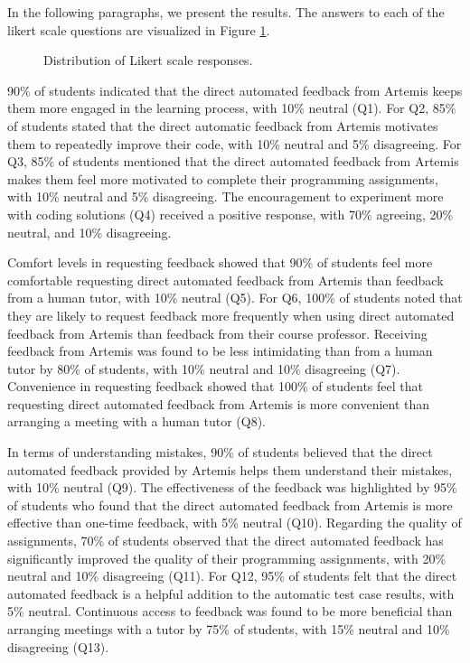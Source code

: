 \documentclass[manuscript,screen,review]{acmart}
\begin{document}
In the following paragraphs, we present the results. 
The answers to each of the likert scale questions are visualized in Figure \ref{fig:Survey-Results}.

\begin{figure}[htpb]
  \centering
  \resizebox{0.8\textwidth}{!}{
    
  }
  \caption[Distribution of Likert scale responses]{Distribution of Likert scale responses.}
  \label{fig:Survey-Results}
\end{figure}

90\% of students indicated that the direct automated feedback from Artemis keeps them more engaged in the learning process, with 10\% neutral (Q1).
For Q2, 85\% of students stated that the direct automatic feedback from Artemis motivates them to repeatedly improve their code, with 10\% neutral and 5\% disagreeing.
For Q3, 85\% of students mentioned that the direct automated feedback from Artemis makes them feel more motivated to complete their programming assignments, with 10\% neutral and 5\% disagreeing.
The encouragement to experiment more with coding solutions (Q4) received a positive response, with 70\% agreeing, 20\% neutral, and 10\% disagreeing.


Comfort levels in requesting feedback showed that 90\% of students feel more comfortable requesting direct automated feedback from Artemis than feedback from a human tutor, with 10\% neutral (Q5).
For Q6, 100\% of students noted that they are likely to request feedback more frequently when using direct automated feedback from Artemis than feedback from their course professor.
Receiving feedback from Artemis was found to be less intimidating than from a human tutor by 80\% of students, with 10\% neutral and 10\% disagreeing (Q7).
Convenience in requesting feedback showed that 100\% of students feel that requesting direct automated feedback from Artemis is more convenient than arranging a meeting with a human tutor (Q8).


In terms of understanding mistakes, 90\% of students believed that the direct automated feedback provided by Artemis helps them understand their mistakes, with 10\% neutral (Q9).
The effectiveness of the feedback was highlighted by 95\% of students who found that the direct automated feedback from Artemis is more effective than one-time feedback, with 5\% neutral (Q10).
Regarding the quality of assignments, 70\% of students observed that the direct automated feedback has significantly improved the quality of their programming assignments, with 20\% neutral and 10\% disagreeing (Q11).
For Q12, 95\% of students felt that the direct automated feedback is a helpful addition to the automatic test case results, with 5\% neutral.
Continuous access to feedback was found to be more beneficial than arranging meetings with a tutor by 75\% of students, with 15\% neutral and 10\% disagreeing (Q13).
\end{document}

